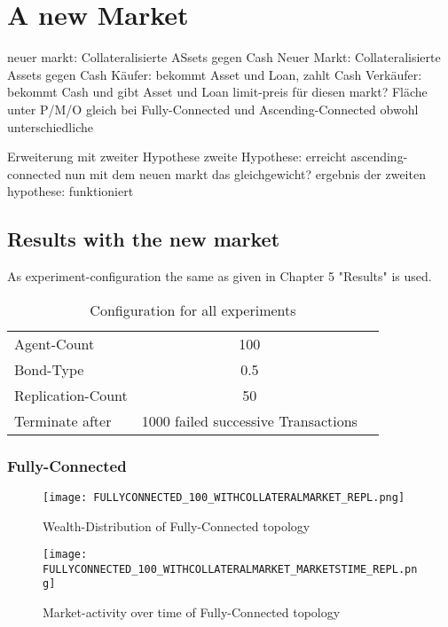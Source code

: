 \documentclass[Bachelorarbeit.tex]{subfiles}
\begin{document}
\graphicspath{{./figures/newMarket/}}	%

\chapter{A new Market}
neuer markt: Collateralisierte ASsets gegen Cash			
	Neuer Markt: Collateralisierte Assets gegen Cash
	Käufer: 		bekommt Asset und Loan, zahlt Cash
	Verkäufer: 		bekommt Cash und gibt Asset und Loan
	limit-preis für diesen markt?
	Fläche unter P/M/O gleich bei Fully-Connected und Ascending-Connected obwohl unterschiedliche

Erweiterung mit zweiter Hypothese
zweite Hypothese: erreicht ascending-connected nun mit dem neuen markt das gleichgewicht?
ergebnis der zweiten hypothese: funktioniert
		
\section{Results with the new market}	
As experiment-configuration the same as given in Chapter 5 "Results" is used.

\begin{table}[h]
	\centering
	\caption{Configuration for all experiments}
	\begin{tabular} { l c r }
		\hline
		Agent-Count & 100 \\
		Bond-Type & 0.5 \\
		Replication-Count & 50 \\
		Terminate after & 1000 failed successive Transactions \\
		\hline
	\end{tabular}
\end{table}

\subsection{Fully-Connected}
\begin{figure}[H]
	\centering
  \texttt{[image: FULLYCONNECTED\_100\_WITHCOLLATERALMARKET\_REPL.png]}
	\caption{Wealth-Distribution of Fully-Connected topology}
	\label{fig:wealth_FULLYCONNECTED_100_WITHCOLLATERALMARKET_REPL}
\end{figure}

\begin{figure}[H]
	\centering
  \texttt{[image: FULLYCONNECTED\_100\_WITHCOLLATERALMARKET\_MARKETSTIME\_REPL.png]}
  	\caption{Market-activity over time of Fully-Connected topology}
	\label{fig:wealth_FULLYCONNECTED_100_WITHCOLLATERALMARKET_MARKETSTIME_REPL}
\end{figure}
\end{document}
